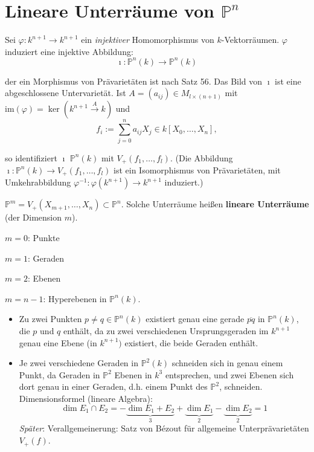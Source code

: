 
\section{Lineare Unterräume von $\mathbb{P}^{n}$}
\label{sec:lineare-unterraeume-von-pn}

Sei $\varphi:k^{n+1}\rightarrow k^{n+1}$ ein \emph{injektiver} Homomorphismus
von $k$-Vektorräumen. $\varphi$ induziert eine injektive Abbildung:
\[
  \imath:\mathbb{P}^{n}(k)\rightarrow\mathbb{P}^{n}(k)
\]

der ein Morphismus von Prävarietäten ist nach Satz 56. Das Bild von
$\imath$ ist eine abgeschlossene Untervarietät. Ist $A=(a_{ij})\in M_{l\times(n+1)}$
mit $\text{im}(\varphi)=\ker(k^{n+1}\xrightarrow{A}k)$ und
\[
  f_{i}:=\sum_{j=0}^{n}a_{ij}X_{j}\in k[X_{0},\ldots,X_{n}],
\]

so identifiziert $\imath$ $\mathbb{P}^{n}(k)$ mit $V_{+}(f_{1},\ldots,f_{l})$.
(Die Abbildung $\imath:\mathbb{P}^{n}(k)\rightarrow V_{+}(f_{1},\ldots,f_{l})$
ist ein Isomorphismus von Prävarietäten, mit Umkehrabbildung $\varphi^{-1}:\varphi(k^{n+1})\rightarrow k^{n+1}$
induziert.)
\begin{example*}
  $\mathbb{P}^{m}=V_{+}(X_{m+1},\ldots,X_{n})\subset\mathbb{P}^{n}$.
  Solche Unterräume heißen \textbf{lineare Unterräume} (der Dimension
  $m$).

  $m=0$: Punkte

  $m=1$: Geraden

  $m=2$: Ebenen

  $m=n-1$: Hyperebenen in $\mathbb{P}^{n}(k)$.
  \begin{itemize}
  \item Zu zwei Punkten $p\neq q\in\mathbb{P}^{n}(k)$ existiert genau eine
    gerade $\overline{pq}$ in $\mathbb{P}^{n}(k)$, die $p$ und $q$
    enthält, da zu zwei verschiedenen Ursprungsgeraden im $k^{n+1}$ genau
    eine Ebene (in $k^{n+1})$ existiert, die beide Geraden enthält.
  \end{itemize}
\end{example*}
\begin{itemize}
\item Je zwei verschiedene Geraden in $\mathbb{P}^{2}(k)$ schneiden sich
  in genau einem Punkt, da Geraden in $\mathbb{P}^{2}$ Ebenen in $k^{3}$
  entsprechen, und zwei Ebenen sich dort genau in einer Geraden, d.h.
  einem Punkt des $\mathbb{P}^{2}$, schneiden. Dimensionsformel (lineare
  Algebra):
  \[
    \dim E_{1}\cap E_{2}=-\underbrace{\dim E_{1}+E_{2}}_{3}+\underbrace{\dim E_{1}}_{2}-\underbrace{\dim E_{2}}_{2}=1
  \]
  \emph{Später}: Verallgemeinerung: Satz von Bézout für allgemeine Unterprävarietäten
  $V_{+}(f)$.
\end{itemize}

